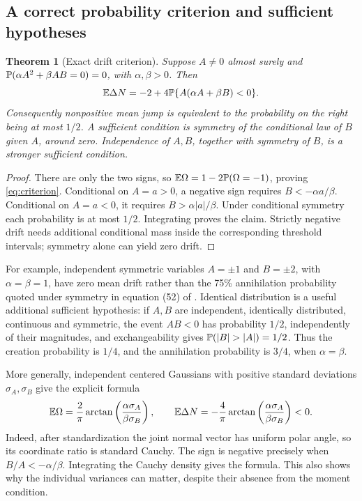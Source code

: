 \documentclass[11pt,a4paper]{article}
\newtheorem{theorem}{Theorem}[section]
\theoremstyle{remark}\newtheorem{remark}[theorem]{Remark}
\begin{document}
\subsection{A correct probability criterion and sufficient hypotheses}
\begin{theorem}[Exact drift criterion]\label{thm:criterion}
Suppose \(A\ne0\) almost surely and \(\mathbb P(\alpha A^2+\beta AB=0)=0\), with \(\alpha,\beta>0\). Then
\begin{equation}\label{eq:criterion}
 \mathbb E\Delta N=-2+4\mathbb P\{A(\alpha A+\beta B)<0\}.
\end{equation}
Consequently nonpositive mean jump is equivalent to the probability on the right being at most \(1/2\). A sufficient condition is symmetry of the conditional law of \(B\) given \(A\), around zero. Independence of \(A,B\), together with symmetry of \(B\), is a stronger sufficient condition.
\end{theorem}
\begin{proof}
There are only the two signs, so \(\mathbb E\Omega=1-2\mathbb P(\Omega=-1)\), proving \eqref{eq:criterion}. Conditional on \(A=a>0\), a negative sign requires \(B<-\alpha a/\beta\). Conditional on \(A=a<0\), it requires \(B>\alpha|a|/\beta\). Under conditional symmetry each probability is at most \(1/2\). Integrating proves the claim. Strictly negative drift needs additional conditional mass inside the corresponding threshold intervals; symmetry alone can yield zero drift.
\end{proof}

For example, independent symmetric variables \(A=\pm1\) and \(B=\pm2\), with \(\alpha=\beta=1\), have zero mean drift rather than the 75\% annihilation probability quoted under symmetry in equation (52) of \citet{D15}. Identical distribution is a useful additional sufficient hypothesis: if \(A,B\) are independent, identically distributed, continuous and symmetric, the event \(AB<0\) has probability \(1/2\), independently of their magnitudes, and exchangeability gives \(\Prob(|B|>|A|)=1/2\). Thus the creation probability is \(1/4\), and the annihilation probability is \(3/4\), when \(\alpha=\beta\).

More generally, independent centered Gaussians with positive standard deviations \(\sigma_A,\sigma_B\) give the explicit formula
\[
 \mathbb E\Omega=\frac2\pi\arctan\left(\frac{\alpha\sigma_A}{\beta\sigma_B}\right),
 \qquad
 \mathbb E\Delta N=-\frac4\pi\arctan\left(\frac{\alpha\sigma_A}{\beta\sigma_B}\right)<0.
\]
Indeed, after standardization the joint normal vector has uniform polar angle, so its coordinate ratio is standard Cauchy. The sign is negative precisely when \(B/A<-\alpha/\beta\). Integrating the Cauchy density gives the formula. This also shows why the individual variances can matter, despite their absence from the moment condition.
\end{document}
